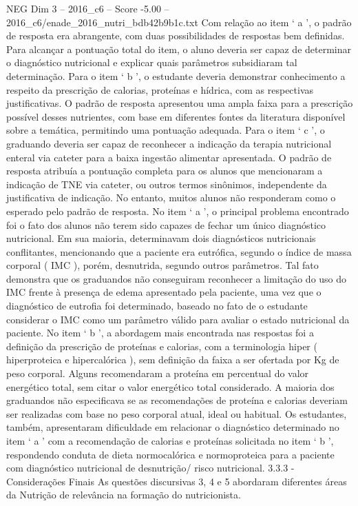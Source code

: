 \begin{textsample}{NEG Dim 3 – 2016\_c6 – Score -5.00 – 2016\_c6/enade\_2016\_nutri\_bdb42b9b1c.txt}
Com relação ao item ‘ a ’, o padrão de resposta era abrangente, com duas possibilidades de respostas bem definidas.
Para alcançar a pontuação total do item, o aluno deveria ser capaz de determinar o diagnóstico nutricional e explicar quais parâmetros subsidiaram tal determinação.
Para o item ‘ b ’, o estudante deveria demonstrar conhecimento a respeito da prescrição de calorias, proteínas e hídrica, com as respectivas justificativas.
O padrão de resposta apresentou uma ampla faixa para a prescrição possível desses nutrientes, com base em diferentes fontes da literatura disponível sobre a temática, permitindo uma pontuação adequada.
Para o item ‘ c ’, o graduando deveria ser capaz de reconhecer a indicação da terapia nutricional enteral via cateter para a baixa ingestão alimentar apresentada.
O padrão de resposta atribuía a pontuação completa para os alunos que mencionaram a indicação de TNE via cateter, ou outros termos sinônimos, independente da justificativa de indicação.
No entanto, muitos alunos não responderam como o esperado pelo padrão de resposta.
No item ‘ a ’, o principal problema encontrado foi o fato dos alunos não terem sido capazes de fechar um único diagnóstico nutricional.
Em sua maioria, determinavam dois diagnósticos nutricionais conflitantes, mencionando que a paciente era eutrófica, segundo o índice de massa corporal ( IMC ), porém, desnutrida, segundo outros parâmetros.
Tal fato demonstra que os graduandos não conseguiram reconhecer a limitação do uso do IMC frente à presença de edema apresentado pela paciente, uma vez que o diagnóstico de eutrofia foi determinado, baseado no fato de o estudante considerar o IMC como um parâmetro válido para avaliar o estado nutricional da paciente.
No item ‘ b ’, a abordagem mais encontrada nas respostas foi a definição da prescrição de proteínas e calorias, com a terminologia hiper ( hiperproteica e hipercalórica ), sem definição da faixa a ser ofertada por Kg de peso corporal.
Alguns recomendaram a proteína em percentual do valor energético total, sem citar o valor energético total considerado.
A maioria dos graduandos não especificava se as recomendações de proteína e calorias deveriam ser realizadas com base no peso corporal atual, ideal ou habitual.
Os estudantes, também, apresentaram dificuldade em relacionar o diagnóstico determinado no item ‘ a ’ com a recomendação de calorias e proteínas solicitada no item ‘ b ’, respondendo conduta de dieta normocalórica e normoproteica para a paciente com diagnóstico nutricional de desnutrição/ risco nutricional. 3.3.3 - Considerações Finais As questões discursivas 3, 4 e 5 abordaram diferentes áreas da Nutrição de relevância na formação do nutricionista.

\end{textsample}
